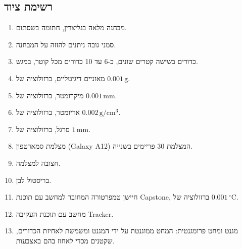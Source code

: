 \documentclass[10pt,a4paper]{article}
\newcommand{\textenglish}[1]{\foreignlanguage{english}{#1}}
\newcommand{\U}[1]{\,\mathrm{#1}}
\begin{document}
\subsection*{רשימת ציוד}
\begin{enumerate}\setlength{\itemsep}{0pt}\setlength{\parskip}{0pt}
  \item מבחנה מלאה בגליצרין, חתומה בשסתום.
  \item סמני גובה ניתנים להזזה על המבחנה.
  \item כדורים בשישה קטרים שונים, כ-6 עד 10 כדורים מכל קוטר, במגש.
  \item מאזניים דיגיטליים, ברזולוציה של $0.001\U{g}$.
  \item מיקרומטר, ברזולוציה של $0.001\U{mm}$.
  \item אריומטר, ברזולוציה של $0.002\U{g/cm^3}$.
  \item סרגל, ברזולוציה של $1\U{mm}$.
  \item מצלמת סמארטפון (\textenglish{Galaxy A12}) המצלמת 30 פריימים בשנייה.
  \item חצובה למצלמה.
  \item בריסטול לבן.
  \item חיישן טמפרטורה המחובר למחשב עם תוכנת \textenglish{Capstone}, ברזולוציה של $0.001\U{^\circ C}$.
  \item מחשב עם תוכנת העקיבה \textenglish{Tracker}.
  \item מגנט ומחט פרומגנטית: המחט ממוגנטת על ידי המגנט ומשמשת לאחיזת הכדורים, שקטנים מכדי לאחוז בהם באצבעות.
\end{enumerate}
\end{document}
